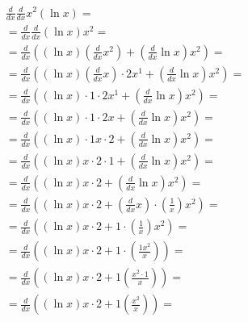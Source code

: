 \documentclass{article}
\begin{document}
\allowdisplaybreaks
\begin{gather*}
{{\frac{{d}}{{d{{x}}}}}{{{\frac{{d}}{{d{{x}}}}}{{{{x}^{2}}{\left(\ln{{x}}\right)}}}}}}=\\
={{\frac{{d}}{{d{{x}}}}}{{{\frac{{d}}{{d{{x}}}}}{{{\left(\ln{{x}}\right)}{{x}^{2}}}}}}}=\\
={{\frac{{d}}{{d{{x}}}}}{{\left({{\left(\ln{{x}}\right)}{\left({\frac{{d}}{{d{{x}}}}}{{{x}^{2}}}\right)}}+{{\left({\frac{{d}}{{d{{x}}}}}{{\ln{{x}}}}\right)}{{x}^{2}}}\right)}}}=\\
={{\frac{{d}}{{d{{x}}}}}{{\left({{\left(\ln{{x}}\right)}{{\left({\frac{{d}}{{d{{x}}}}}{{x}}\right)}{\cdot}{{2}{{x}^{1}}}}}+{{\left({\frac{{d}}{{d{{x}}}}}{{\ln{{x}}}}\right)}{{x}^{2}}}\right)}}}=\\
={{\frac{{d}}{{d{{x}}}}}{{\left({{\left(\ln{{x}}\right)}{\cdot}{{1}{\cdot}{{2}{{x}^{1}}}}}+{{\left({\frac{{d}}{{d{{x}}}}}{{\ln{{x}}}}\right)}{{x}^{2}}}\right)}}}=\\
={{\frac{{d}}{{d{{x}}}}}{{\left({{\left(\ln{{x}}\right)}{\cdot}{{1}{\cdot}{{2}{x}}}}+{{\left({\frac{{d}}{{d{{x}}}}}{{\ln{{x}}}}\right)}{{x}^{2}}}\right)}}}=\\
={{\frac{{d}}{{d{{x}}}}}{{\left({{\left(\ln{{x}}\right)}{\cdot}{{1}{{x}{\cdot}{2}}}}+{{\left({\frac{{d}}{{d{{x}}}}}{{\ln{{x}}}}\right)}{{x}^{2}}}\right)}}}=\\
={{\frac{{d}}{{d{{x}}}}}{{\left({{\left(\ln{{x}}\right)}{{x}{\cdot}{{2}{\cdot}{1}}}}+{{\left({\frac{{d}}{{d{{x}}}}}{{\ln{{x}}}}\right)}{{x}^{2}}}\right)}}}=\\
={{\frac{{d}}{{d{{x}}}}}{{\left({{\left(\ln{{x}}\right)}{{x}{\cdot}{2}}}+{{\left({\frac{{d}}{{d{{x}}}}}{{\ln{{x}}}}\right)}{{x}^{2}}}\right)}}}=\\
={{\frac{{d}}{{d{{x}}}}}{{\left({{\left(\ln{{x}}\right)}{{x}{\cdot}{2}}}+{{\left({\frac{{d}}{{d{{x}}}}}{{x}}\right)}{\cdot}{{\left(\frac{{1}}{{x}}\right)}{{x}^{2}}}}\right)}}}=\\
={{\frac{{d}}{{d{{x}}}}}{{\left({{\left(\ln{{x}}\right)}{{x}{\cdot}{2}}}+{{1}{\cdot}{{\left(\frac{{1}}{{x}}\right)}{{x}^{2}}}}\right)}}}=\\
={{\frac{{d}}{{d{{x}}}}}{{\left({{\left(\ln{{x}}\right)}{{x}{\cdot}{2}}}+{{1}{\cdot}{\left(\frac{{{1}{{x}^{2}}}}{{x}}\right)}}\right)}}}=\\
={{\frac{{d}}{{d{{x}}}}}{{\left({{\left(\ln{{x}}\right)}{{x}{\cdot}{2}}}+{{1}{\left(\frac{{{{x}^{2}}{\cdot}{1}}}{{x}}\right)}}\right)}}}=\\
={{\frac{{d}}{{d{{x}}}}}{{\left({{\left(\ln{{x}}\right)}{{x}{\cdot}{2}}}+{{1}{\left(\frac{{{x}^{2}}}{{x}}\right)}}\right)}}}=\\

\end{gather*}
\end{document}
